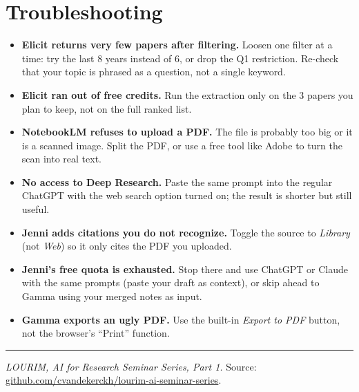 \documentclass[11pt,a4paper]{article}
\begin{document}
\section{Troubleshooting}
\label{app:troubleshoot}

\begin{itemize}[leftmargin=*, itemsep=2pt]
  \item \textbf{Elicit returns very few papers after filtering.} Loosen one filter at a time: try the last 8 years instead of 6, or drop the Q1 restriction. Re-check that your topic is phrased as a question, not a single keyword.
  \item \textbf{Elicit ran out of free credits.} Run the extraction only on the 3 papers you plan to keep, not on the full ranked list.
  \item \textbf{NotebookLM refuses to upload a PDF.} The file is probably too big or it is a scanned image. Split the PDF, or use a free tool like Adobe to turn the scan into real text.
  \item \textbf{No access to Deep Research.} Paste the same prompt into the regular ChatGPT with the web search option turned on; the result is shorter but still useful.
  \item \textbf{Jenni adds citations you do not recognize.} Toggle the source to \emph{Library} (not \emph{Web}) so it only cites the PDF you uploaded.
  \item \textbf{Jenni's free quota is exhausted.} Stop there and use ChatGPT or Claude with the same prompts (paste your draft as context), or skip ahead to Gamma using your merged notes as input.
  \item \textbf{Gamma exports an ugly PDF.} Use the built-in \emph{Export to PDF} button, not the browser's ``Print'' function.
\end{itemize}

\vspace{1em}
\hrule
\vspace{0.5em}
\small \textit{LOURIM, AI for Research Seminar Series, Part 1.} Source: \href{https://github.com/cvandekerckh/lourim-ai-seminar-series}{github.com/cvandekerckh/lourim-ai-seminar-series}.
\end{document}
